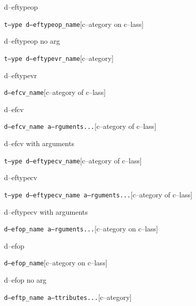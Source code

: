 \documentclass{book}
\begin{document}
\begin{titlepage}
%
d--eftypeop

\noindent\texttt\bgroup{}t--ype d--eftypeop\_name\egroup{}\hfill[c--ategory on c--lass]



%
d--eftypeop no arg

\noindent\texttt\bgroup{}t--ype d--eftypevr\_name\egroup{}\hfill[c--ategory]



%
d--eftypevr

\noindent\texttt\bgroup{}d--efcv\_name\egroup{}\hfill[c--ategory of c--lass]



%
d--efcv

\noindent\texttt\bgroup{}d--efcv\_name a--rguments...\egroup{}\hfill[c--ategory of c--lass]



%
d--efcv with arguments

\noindent\texttt\bgroup{}t--ype d--eftypecv\_name\egroup{}\hfill[c--ategory of c--lass]



%
d--eftypecv

\noindent\texttt\bgroup{}t--ype d--eftypecv\_name a--rguments...\egroup{}\hfill[c--ategory of c--lass]



%
d--eftypecv with arguments

\noindent\texttt\bgroup{}d--efop\_name a--rguments...\egroup{}\hfill[c--ategory on c--lass]



%
d--efop

\noindent\texttt\bgroup{}d--efop\_name\egroup{}\hfill[c--ategory on c--lass]



%
d--efop no arg

\noindent\texttt\bgroup{}d--eftp\_name a--ttributes...\egroup{}\hfill[c--ategory]




\end{titlepage}
\end{document}
